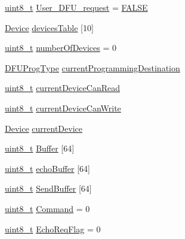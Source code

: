 \begin{DoxyCompactItemize}
\item 
\hyperlink{stdint_8h_aba7bc1797add20fe3efdf37ced1182c5}{uint8\-\_\-t} \hyperlink{group___open_pilot_b_l_ga4e35257eb1d649bd7353cb4a4d37d5fb}{User\-\_\-\-D\-F\-U\-\_\-request} = \hyperlink{group___exported__types_gaf6a258d8f3ee5206d682d799316314b1aa1e095cc966dbecf6a0d8aad75348d1a}{F\-A\-L\-S\-E}
\item 
\hyperlink{struct_device}{Device} \hyperlink{group___open_pilot_b_l_ga0cfea7d81e98a1eed11dfb4e9fe16704}{devices\-Table} \mbox{[}10\mbox{]}
\item 
\hyperlink{stdint_8h_aba7bc1797add20fe3efdf37ced1182c5}{uint8\-\_\-t} \hyperlink{group___open_pilot_b_l_ga1b37428de16897c154a5b2c137f164fd}{number\-Of\-Devices} = 0
\item 
\hyperlink{group___copter_control_b_l_ga0137f05f9f13737114e6bd864c448688}{D\-F\-U\-Prog\-Type} \hyperlink{group___open_pilot_b_l_gabbc56fe66ed81f83684d10b8cae06e82}{current\-Programming\-Destination}
\item 
\hyperlink{stdint_8h_aba7bc1797add20fe3efdf37ced1182c5}{uint8\-\_\-t} \hyperlink{group___open_pilot_b_l_ga2cee1725bfc6f9ac723c3decb193c8c2}{current\-Device\-Can\-Read}
\item 
\hyperlink{stdint_8h_aba7bc1797add20fe3efdf37ced1182c5}{uint8\-\_\-t} \hyperlink{group___open_pilot_b_l_ga1347c5307f6e1b00d3a65e06184d0e09}{current\-Device\-Can\-Write}
\item 
\hyperlink{struct_device}{Device} \hyperlink{group___open_pilot_b_l_ga6a2dbcb4687334b324d72b9824174903}{current\-Device}
\item 
\hyperlink{stdint_8h_aba7bc1797add20fe3efdf37ced1182c5}{uint8\-\_\-t} \hyperlink{group___open_pilot_b_l_ga4087ff5eba1dd1ed72c881f9c6ecc662}{Buffer} \mbox{[}64\mbox{]}
\item 
\hyperlink{stdint_8h_aba7bc1797add20fe3efdf37ced1182c5}{uint8\-\_\-t} \hyperlink{group___open_pilot_b_l_ga7dd4853474086e75f278ea07c2f0b506}{echo\-Buffer} \mbox{[}64\mbox{]}
\item 
\hyperlink{stdint_8h_aba7bc1797add20fe3efdf37ced1182c5}{uint8\-\_\-t} \hyperlink{group___open_pilot_b_l_ga8f7836468d53f1bf54ab28474ae14624}{Send\-Buffer} \mbox{[}64\mbox{]}
\item 
\hyperlink{stdint_8h_aba7bc1797add20fe3efdf37ced1182c5}{uint8\-\_\-t} \hyperlink{group___open_pilot_b_l_ga5d77325144370536cfb1275bb9812dd8}{Command} = 0
\item 
\hyperlink{stdint_8h_aba7bc1797add20fe3efdf37ced1182c5}{uint8\-\_\-t} \hyperlink{group___open_pilot_b_l_gaeda788a6eac8e2e01a62eb1f62627c8e}{Echo\-Req\-Flag} = 0

\end{DoxyCompactItemize}
